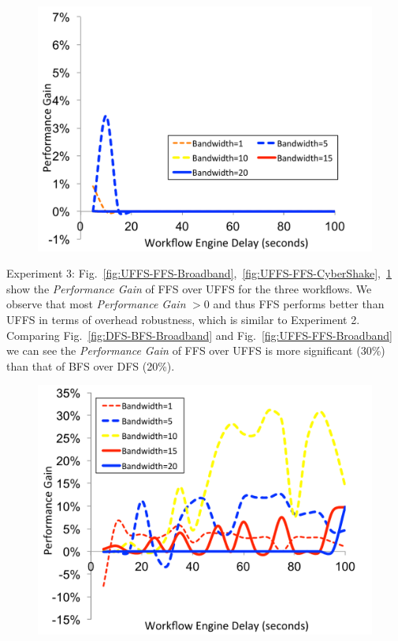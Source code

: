 \documentclass[final]{IEEEtran}
\begin{document}
\begin{figure}[!htb]
\centering
 \includegraphics[width=0.9\linewidth]{figure/UFFS-FFS-Montage.pdf}
  \label{fig:UFFS-FFS-Montage}
  \vspace{-10pt}
\end{figure}



Experiment 3: Fig.~\ref{fig:UFFS-FFS-Broadband},~\ref{fig:UFFS-FFS-CyberShake},~\ref{fig:UFFS-FFS-Montage} show the \emph{Performance Gain} of FFS over UFFS for the three workflows. We observe that most  \emph{Performance Gain} $>0$ and thus FFS performs better than UFFS in terms of overhead robustness, which is similar to Experiment 2. Comparing Fig.~\ref{fig:DFS-BFS-Broadband} and Fig.~\ref{fig:UFFS-FFS-Broadband} we can see the \emph{Performance Gain} of FFS over UFFS is more significant (30\%) than that of BFS over DFS (20\%).  
\begin{figure}[!htb]
\centering
 \includegraphics[width=0.9\linewidth]{figure/UIFS-IFS-Broadband.pdf}
  \label{fig:UIFS-IFS-Broadband}
  \vspace{-10pt}
\end{figure}
\end{document}
